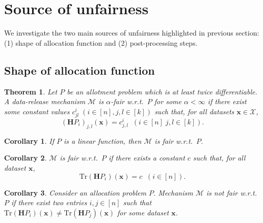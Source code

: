 \documentclass[9pt,twocolumn,twoside,lineno]{pnas-new}
\newcommand{\cM}{\mathcal{M}}
\newcommand{\cX}{\mathcal{X}}
\newtheorem{corollary}{Corollary}
\newtheorem{theorem}{Theorem}
\begin{document}
\section*{Source of unfairness}
We investigate the two main sources of unfairness highlighted in previous section: (1) shape of allocation function and (2) post-processing steps. 
\subsection*{Shape of allocation function}

\begin{theorem}
\label{lem:fair_bound_allottments}
Let $P$ be an allotment problem which is at least twice differentiable.
A data-release mechanism $\cM$ is $\alpha$-fair w.r.t.~$P$ for some 
$\alpha < \infty$ if there exist some constant values 
$c^i_{jl} \; (i \in [n], j,l \in [k])$ such that, for all datasets $\bm{x} \in \cX$, 
\[
  (\bm{H}P_i)_{j,l}(\bm{x}) = c^i_{j,l}   \;\; (i\in[n]\; j,l\in[k]).
\]
\end{theorem}

\begin{corollary}
\label{cor:2}
If $P$ is a linear function, then $\cM$ is fair w.r.t.~$P$.
\end{corollary}


\begin{corollary}
\label{cor:3}
$\cM$ is fair w.r.t.~$P$ if there exists a constant $c$ such that,
for all dataset $\bm{x}$, 
\[
\mbox{Tr}(\bm{H}P_i)(\bm{x}) = c \;\; (i \in [n]).
\]
\end{corollary}

\begin{corollary}
Consider an allocation problem $P$. Mechanism $\cM$ is not fair
w.r.t.~$P$ if there exist two entries $i, j \in [n]$ such that
$\mbox{Tr}(\bm{H}P_i)(\bm{x}) \neq \mbox{Tr}(\bm{H}P_j)(\bm{x})$ for some dataset
$\bm{x}$.
\end{corollary}
\end{document}
